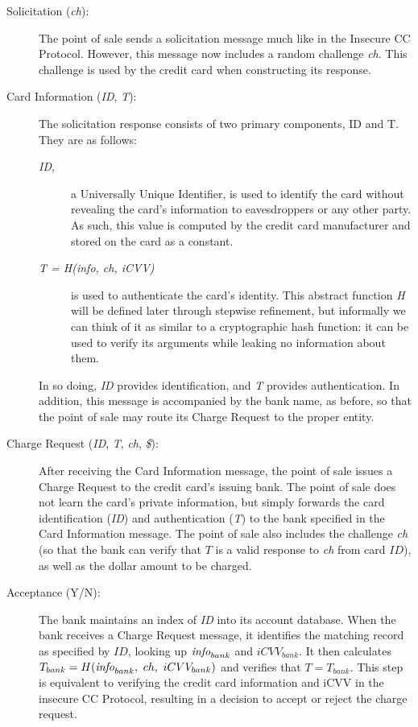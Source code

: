 \begin{description}
\item[Solicitation (\emph{ch}):]
The point of sale sends a solicitation message much like in the Insecure CC Protocol.
However, this message now includes a random challenge \emph{ch}.
This challenge is used by the credit card when constructing its response.

\item[Card Information (\emph{ID}, \emph{T}):]
The solicitation response consists of two primary components, ID and T. They are as follows:

\begin{description}
\item[\emph{ID},]a Universally Unique Identifier\cite{uuid}, is used to identify the card without revealing the card's information to eavesdroppers or any other party.
As such, this value is computed by the credit card manufacturer and stored on the card as a constant.

\item[\emph{T = H(info, ch, iCVV)}] is used to authenticate the card's identity.
This abstract function \emph{H} will be defined later through stepwise refinement, but informally we can think of it as similar to a cryptographic hash function:
	it can be used to verify its arguments while leaking no information about them.
\end{description}

In so doing, \emph{ID} provides identification, and \emph{T} provides authentication.
In addition, this message is accompanied by the bank name, as before, so that the point of sale may route its Charge Request to the proper entity.

\item[Charge Request (\emph{ID}, \emph{T}, \emph{ch}, \emph{\$}):]
After receiving the Card Information message, the point of sale issues a Charge Request to the credit card's issuing bank.
The point of sale does not learn the card's private information, but simply forwards the card identification (\emph{ID}) and authentication (\emph{T}) to the bank specified in the Card Information message.
The point of sale also includes the challenge \emph{ch}
	(so that the bank can verify that $T$ is a valid response to \emph{ch} from card $ID$),
	as well as the dollar amount to be charged.

\item[Acceptance (Y/N):]
The bank maintains an index of \emph{ID} into its account database.
When the bank receives a Charge Request message, it identifies the matching record as specified by $ID$, looking up $\textrm{\emph{info}}_{bank}$ and $iCVV_{bank}$.
It then calculates $T_{bank} = H(\textrm{\emph{info}}_{bank},~ ch,~ iCVV_{bank})$ and verifies that $T = T_{bank}$.
This step is equivalent to verifying the credit card information and iCVV in the insecure CC Protocol,
	resulting in a decision to accept or reject the charge request.

\end{description}





